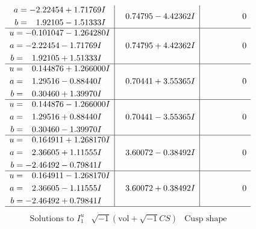 \documentclass[1p]{elsarticle_modified}
\theoremstyle{definition}
\newcommand{\I}{\sqrt{-1}}
\begin{document}
$$\begin{array}{c|c|c}
\begin{aligned}
a &= -2.22454 + 1.71769 I \\
b &= \phantom{-}1.92105 - 1.51333 I\end{aligned}
 & \phantom{-}0.74795 - 4.42362 I & \phantom{-0.000000 } 0 \\ \hline\begin{aligned}
u &= -0.101047 - 1.264280 I \\
a &= -2.22454 - 1.71769 I \\
b &= \phantom{-}1.92105 + 1.51333 I\end{aligned}
 & \phantom{-}0.74795 + 4.42362 I & \phantom{-0.000000 } 0 \\ \hline\begin{aligned}
u &= \phantom{-}0.144876 + 1.266000 I \\
a &= \phantom{-}1.29516 - 0.88440 I \\
b &= \phantom{-}0.30460 + 1.39970 I\end{aligned}
 & \phantom{-}0.70441 + 3.55365 I & \phantom{-0.000000 } 0 \\ \hline\begin{aligned}
u &= \phantom{-}0.144876 - 1.266000 I \\
a &= \phantom{-}1.29516 + 0.88440 I \\
b &= \phantom{-}0.30460 - 1.39970 I\end{aligned}
 & \phantom{-}0.70441 - 3.55365 I & \phantom{-0.000000 } 0 \\ \hline\begin{aligned}
u &= \phantom{-}0.164911 + 1.268170 I \\
a &= \phantom{-}2.36605 + 1.11555 I \\
b &= -2.46492 - 0.79841 I\end{aligned}
 & \phantom{-}3.60072 - 0.38492 I & \phantom{-0.000000 } 0 \\ \hline\begin{aligned}
u &= \phantom{-}0.164911 - 1.268170 I \\
a &= \phantom{-}2.36605 - 1.11555 I \\
b &= -2.46492 + 0.79841 I\end{aligned}
 & \phantom{-}3.60072 + 0.38492 I & \phantom{-0.000000 } 0\\
 \hline 
 \end{array}$$\newpage$$\begin{array}{c|c|c}  
\text{Solutions to }I^u_{1}& \I (\text{vol} + \sqrt{-1}CS) & \text{Cusp shape}\\
 \hline 
\begin{aligned}

\end{aligned}
\end{array}$$
\end{document}
